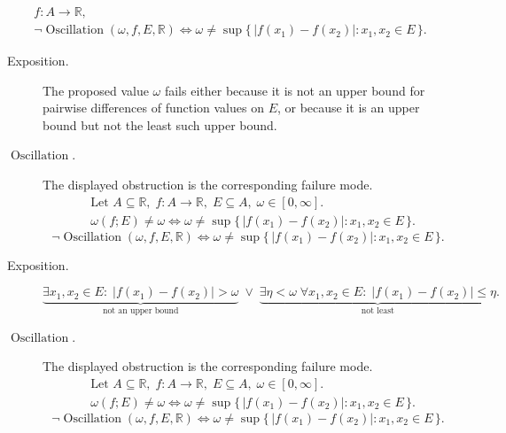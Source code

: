 \begin{remark*}
\[
\begin{aligned}
  f\colon A\to\mathbb{R},\\
\neg\operatorname{Oscillation}(\omega,f,E,\mathbb{R})
\Longleftrightarrow
\omega\ne\sup\{\,|f(x_1)-f(x_2)|:x_1,x_2\in E\,\}.
\end{aligned}
\]
\end{remark*}

\begin{remark*}
\begin{description}
  \item[Exposition.]
The proposed value $\omega$ fails either because it is not an upper
bound for pairwise differences of function values on $E$, or because it
is an upper bound but not the least such upper bound.


  \item[\(\operatorname{Oscillation}.\)]
  The displayed obstruction is the corresponding failure mode.
  \[
\begin{aligned}
&\text{Let } A\subseteq\mathbb{R},\; f:A\to\mathbb{R},\; E\subseteq A,\;
\omega\in[0,\infty].\\
&\omega(f;E)\ne\omega
\Longleftrightarrow
\omega\ne\sup\{\,|f(x_1)-f(x_2)|:x_1,x_2\in E\,\}.
\end{aligned}
  \]
  \[
\neg\operatorname{Oscillation}(\omega,f,E,\mathbb{R})
\Longleftrightarrow
\omega\ne\sup\{\,|f(x_1)-f(x_2)|:x_1,x_2\in E\,\}.
  \]
\end{description}
\end{remark*}

\begin{remark*}
\begin{description}
  \item[Exposition.]
\[
\underbrace{\exists x_1,x_2\in E:\; |f(x_1)-f(x_2)|>\omega}_{\text{not an upper bound}}
\;\lor\;
\underbrace{\exists \eta<\omega\; \forall x_1,x_2\in E:\; |f(x_1)-f(x_2)|\le \eta}_{\text{not least}}.
\]


  \item[\(\operatorname{Oscillation}.\)]
  The displayed obstruction is the corresponding failure mode.
  \[
\begin{aligned}
&\text{Let } A\subseteq\mathbb{R},\; f:A\to\mathbb{R},\; E\subseteq A,\;
\omega\in[0,\infty].\\
&\omega(f;E)\ne\omega
\Longleftrightarrow
\omega\ne\sup\{\,|f(x_1)-f(x_2)|:x_1,x_2\in E\,\}.
\end{aligned}
  \]
  \[
\neg\operatorname{Oscillation}(\omega,f,E,\mathbb{R})
\Longleftrightarrow
\omega\ne\sup\{\,|f(x_1)-f(x_2)|:x_1,x_2\in E\,\}.
  \]
\end{description}
\end{remark*}


